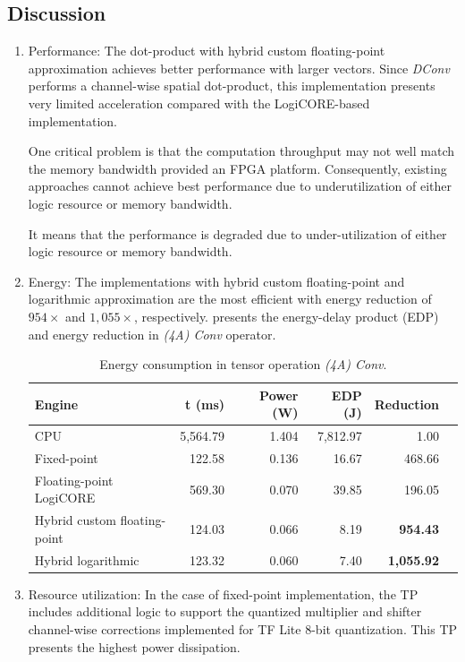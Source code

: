 \subsection{Discussion}
\begin{enumerate}
	\item{Performance}: The dot-product with hybrid custom floating-point approximation achieves better performance with larger vectors. Since \emph{DConv} performs a channel-wise spatial dot-product, this implementation presents very limited acceleration compared with the LogiCORE-based implementation.

	One critical problem is that the computation throughput may not well match the memory bandwidth provided an FPGA platform. Consequently, existing approaches cannot achieve best performance due to underutilization of either logic resource or memory bandwidth.

	It means that the performance is degraded due to under-utilization of either logic resource or memory bandwidth.
	
	\item{Energy}: The implementations with hybrid custom floating-point and logarithmic approximation are the most efficient with energy reduction of $954\times$ and $1,055\times$, respectively.  presents the energy-delay product (EDP) and energy reduction in \emph{(4A) Conv} operator.
	
\begin{table}[!htp]\centering
	\caption{Energy consumption in tensor operation \emph{(4A) Conv}.}\label{tab:edp}
	\scriptsize
	\begin{tabular}{lrrrrr}\toprule
		\textbf{Engine} & \textbf{t (ms)} &\textbf{Power (W)} &\textbf{EDP (J)} &\textbf{Reduction} \\\midrule
		CPU &5,564.79 &1.404 &7,812.97 &1.00 \\
		Fixed-point &122.58 &0.136 &16.67 &468.66 \\
		Floating-point LogiCORE &569.30 &0.070 &39.85 &196.05 \\
		Hybrid custom floating-point &124.03 &0.066 &8.19 &\textbf{954.43} \\
		Hybrid logarithmic &123.32 &0.060 &7.40 &\textbf{1,055.92 }\\
		\bottomrule
	\end{tabular}
\end{table}
	
	\item{Resource utilization}: In the case of fixed-point implementation, the TP includes additional logic to support the quantized multiplier and shifter channel-wise corrections implemented for TF Lite 8-bit quantization. This TP presents the highest power dissipation.
	

\end{enumerate}

